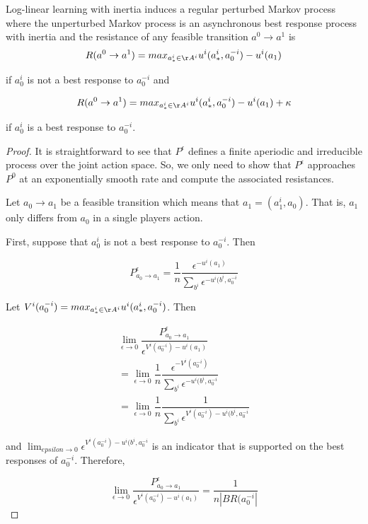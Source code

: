 \begin{lem}
Log-linear learning with inertia induces a regular perturbed Markov process where the unperturbed Markov process is an asynchronous best response process with inertia and the resistance of any feasible transition $a^0 \rightarrow a^1$ is 
$$
R(a^0 \rightarrow a^1) = max_{a^i_* \in \AA^i} u^i(a^i_*, a^{-i}_0) - u^i(a_1)
$$

if $a^i_0$ is not a best response to $a^{-i}_0$ and

$$
R(a^0 \rightarrow a^1) = max_{a^i_* \in \AA^i} u^i(a^i_*, a^{-i}_0) - u^i(a_1) + \kappa
$$

if $a^i_0$ is a best response to $a^{-i}_0$.

\end{lem}
\begin{proof}
It is straightforward to see that $P^{\epsilon}$ defines a finite aperiodic and irreducible process over the joint action space. So, we only need to show that $P^{\epsilon}$ approaches $P^0$ at an exponentially smooth rate and compute the associated resistances.

Let $a_0 \rightarrow a_1$ be a feasible transition which means that $a_1 = (a^i_1, a_0)$. That is, $a_1$ only differs from $a_0$ in a single players action.

First, suppose that $a^i_0$ is not a best response to $a^{-i}_0$. Then

$$
P^{\epsilon}_{a_0 \rightarrow a_1} = \dfrac{1}{n} \dfrac{\epsilon^{-u^i(a_1)}}{\sum_{b^i} \epsilon^{-u^i(b^i, a^{-i}_0}}
$$

Let $V^i(a_0^{-i}) = max_{a^i_* \in \AA^i} u^i(a^i_*, a^{-i}_0)$. Then

\begin{align*}
\lim_{\epsilon \rightarrow 0} \dfrac{P^{\epsilon}_{a_0 \rightarrow a_1}}{\epsilon^{V^i(a_0^{-i}) - u^i(a_1)}} \\
= \lim_{\epsilon \rightarrow 0} \dfrac{1}{n} \dfrac{\epsilon^{-V^i(a_0^{-i})}}{\sum_{b^i} \epsilon^{-u^i(b^i, a^{-i}_0}} \\
= \lim_{\epsilon \rightarrow 0} \dfrac{1}{n} \dfrac{1}{\sum_{b^i} \epsilon^{V^i(a_0^{-i})-u^i(b^i, a^{-i}_0}}
\end{align*}

and $\lim_{epsilon \rightarrow 0} \epsilon^{V^i(a_0^{-i})-u^i(b^i, a^{-i}_0}$ is an indicator that is supported on the best responses of $a^{-i}_0$. Therefore,

$$
\lim_{\epsilon \rightarrow 0} \dfrac{P^{\epsilon}_{a_0 \rightarrow a_1}}{\epsilon^{V^i(a_0^{-i}) - u^i(a_1)}} = \dfrac{1}{n |BR(a^{-i}_0|}
$$


\end{proof}
